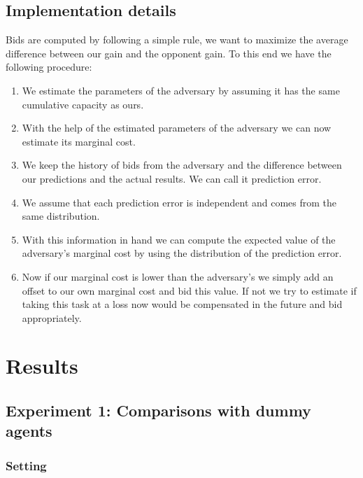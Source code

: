 \documentclass[11pt]{article}
\begin{document}
\subsection{Implementation details}
Bids are computed by following a simple rule, we want to maximize the average
difference between our gain and the opponent gain. To this end we have the
following procedure:
\begin{enumerate}
\item We estimate the parameters of the adversary by assuming it has the same
  cumulative capacity as ours.
\item With the help of the estimated parameters of the adversary we can now
  estimate its marginal cost.
\item We keep the history of bids from the adversary and the difference between
  our predictions and the actual results. We can call it prediction error.
\item We assume that each prediction error is independent and comes from the
  same distribution.
\item With this information in hand we can compute the expected value of the
  adversary's marginal cost by using the distribution of the prediction error.
\item Now if our marginal cost is lower than the adversary's we simply add an
  offset to our own marginal cost and bid this value. If not we try to estimate
  if taking this task at a loss now would be compensated in the future and bid
  appropriately.
\end{enumerate}

\section{Results}

\subsection{Experiment 1: Comparisons with dummy agents}

\subsubsection{Setting}
\end{document}
